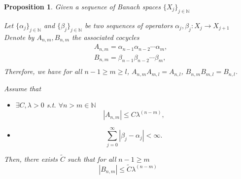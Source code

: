 \documentclass[11pt]{amsart}
\newtheorem{prop}[thm]{Proposition}
\theoremstyle{definition}
\theoremstyle{remark}
\numberwithin{equation}{section}
\begin{document}
\begin{prop}\label{ratesmatrices}
  Given a sequence of Banach spaces $\{ X_j\}_{j \in \mathbb{N}}$

  Let $\{\alpha_j\}_{j \in \mathbb{N}}$ and
   $\{\beta_j\}_{j \in \mathbb{N}}$
  be two sequences of operators
  $\alpha_j, \beta_j: X_j \rightarrow X_{j+1}$
  Denote by $A_{n,m}, B_{n,m}$ the associated \emph{cocycles}
  \begin{equation}\label{cocycle}
    \begin{split}
      &A_{n,m} = \alpha_{n-1} \alpha_{n-2} \cdots \alpha_m , \\
      &B_{n,m} = \beta_{n-1} \beta_{n-2} \cdots \beta_m , \\
      \end{split}
  \end{equation}
  Therefore, we have for all $n -1\ge m \ge l$, $A_{n,m} A_{m,l} = A_{n,l}$,
  $B_{n,m} B_{m,l} = B_{n,l}$.

  Assume that
  \begin{itemize}
  \item[(i)] $ \exists C, \lambda  > 0 $ s.t. $\forall n> m \in \mathbb{N}$
    \[
    |A_{n,m} |  \le C \lambda^{(n-m)},
    \]
  \item[(ii)]
    \[
    \sum_{j=0}^{\infty} | \beta_j - \alpha_j | < \infty .
    \]
  \end{itemize}

  Then, there exists $ \tilde C$ such that  for all $n -1\ge m$
    \[
    |B_{n,m} |  \le \tilde C \lambda^{(n-m)}
    \]
  \end{prop}
\end{document}
